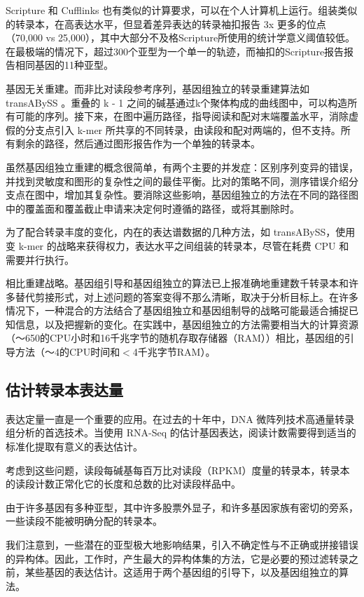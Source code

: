 Scripture 和 Cufflinks 也有类似的计算要求，可以在个人计算机上运行。组装类似的转录本，在高表达水平，但显着差异表达的转录袖扣报告 3x 更多的位点（70,000 vs 25,000），其中大部分不及格Scripture所使用的统计学意义阈值较低。在最极端的情况下，超过300个亚型为一个单一的轨迹，而袖扣的Scripture报告报告相同基因的11种亚型。

基因无关重建。而非比对读段参考序列，基因组独立的转录重建算法如 transABySS 。重叠的 k  -  1 之间的碱基通过k个聚体构成的曲线图中，可以构造所有可能的序列。接下来，在图中遍历路径，指导阅读和配对末端覆盖水平，消除虚假的分支点引入 k-mer 所共享的不同转录，由读段和配对两端的，但不支持。所有剩余的路径，然后通过图形报告​​作为一个单独的转录本。

虽然基因组独立重建的概念很简单，有两个主要的并发症：区别序列变异的错误，并找到灵敏度和图形的复杂性之间的最佳平衡。比对的策略不同，测序错误介绍分支点在图中，增加其复杂性。要消除这些影响，基因组独立的方法在不同的路径图中的覆盖面和覆盖截止申请来决定何时遵循的路径，或将其删除时。

为了配合转录丰度的变化，内在的表达谱数据的几种方法，如 transABySS，使用变 k-mer 的战略来获得权力，表达水平之间组装的转录本，尽管在耗费 CPU 和需要并行执行。

相比重建战略。基因组引导和基因组独立的算法已上报准确地重建数千转录本和许多替代剪接形式，对上述问题的答案变得不那么清晰，取决于分析目标上。在许多情况下，一种混合​​的方法结合了基因组独立和基因组制导的战略可能最适合捕捉已知信息，以及把握新的变化。在实践中，基因组独立的方法需要相当大的计算资源（〜650的CPU小时和16千兆字节的随机存取存储器（RAM））相比，基因组的引导方法（〜4的CPU时间和$<$4千兆字节RAM）。

\subsection{估计转录本表达量}

表达定量一直是一个重要的应用。在过去的十年中，DNA 微阵列技术高通量转录组分析的首选技术。当使用 RNA-Seq 的估计基因表达，阅读计数需要得到适当的标准化提取有意义的表达估计。

考虑到这些问题，读段每碱基每百万比对读段（RPKM）度量的转录本，转录本的读段计数正常化它的长度和总数的比对读段样品中。

由于许多基因有多种亚型，其中许多股票外显子，和许多基因家族有密切的旁系，一些读段不能被明确分配的转录本。

我们注意到，一些潜在的亚型极大地影响结果，引入不确定性与不正确或拼接错误的异构体。因此，工作时，产生最大的异构体集的方法，它是必要的预过滤转录之前，某些基因的表达估计。这适用于两个基因组的引导下，以及基因组独立的算法。

